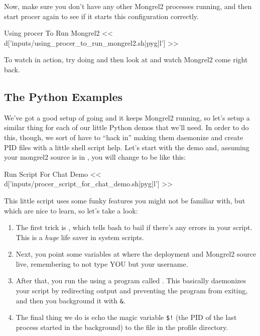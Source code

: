 Now, make sure you don't have any other Mongrel2 processes running,
and then start procer again to see if it starts this configuration
correctly.


\begin{code}{Using procer To Run Mongrel2}
<< d['inputs/using_procer_to_run_mongrel2.sh|pyg|l'] >>
\end{code}

To watch  in action, try doing  and then look at  and watch
Mongrel2 come right back.


\subsection{The Python Examples}

We've got a good setup of  going and it keeps Mongrel2
running, so let's setup a similar thing for each of our little
Python demos that we'll need.  In order to do this, though, we sort
of have to ``hack in'' making them daemonize and create PID files with
a little shell script help.  Let's start with the  demo
and, assuming your mongrel2 source is in ,
you will change  to be like this:

\begin{code}{Run Script For Chat Demo}
<< d['inputs/procer_script_for_chat_demo.sh|pyg|l'] >>
\end{code}

This little script uses some funky features you might not be familiar
with, but which are nice to learn, so let's take a look:


\begin{enumerate}
\item The first trick is , which tells bash to bail if there's
    any errors in your script.  This is a \emph{huge} life saver in system
    scripts.
\item Next, you point some variables at where the deployment and Mongrel2 source
    live, remembering to not type YOU but your username.
\item After that, you run the  using a program called .
    This basically daemonizes your script by redirecting output and
    preventing the program from exiting, and then you background it with \verb|&|.
\item The final thing we do is echo the magic variable \verb|$!| (the PID of the
  last process started in the background) to the  file in the
  profile directory.
\end{enumerate}

